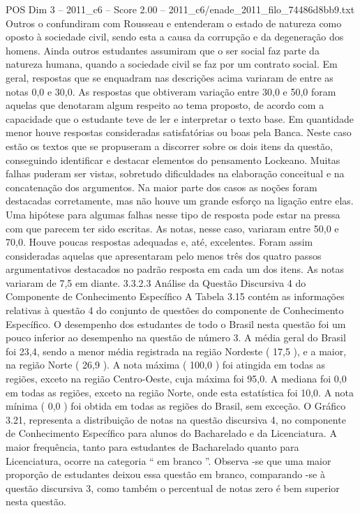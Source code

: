 \begin{textsample}{POS Dim 3 – 2011\_c6 – Score 2.00 – 2011\_c6/enade\_2011\_filo\_74486d8bb9.txt}
Outros o confundiram com Rousseau e entenderam o estado de natureza como oposto à sociedade civil, sendo esta a causa da corrupção e da degeneração dos homens.
Ainda outros estudantes assumiram que o ser social faz parte da natureza humana, quando a sociedade civil se faz por um contrato social.
Em geral, respostas que se enquadram nas descrições acima variaram de entre as notas 0,0 e 30,0.
As respostas que obtiveram variação entre 30,0 e 50,0 foram aquelas que denotaram algum respeito ao tema proposto, de acordo com a capacidade que o estudante teve de ler e interpretar o texto base.
Em quantidade menor houve respostas consideradas satisfatórias ou boas pela Banca.
Neste caso estão os textos que se propuseram a discorrer sobre os dois itens da questão, conseguindo identificar e destacar elementos do pensamento Lockeano.
Muitas falhas puderam ser vistas, sobretudo dificuldades na elaboração conceitual e na concatenação dos argumentos.
Na maior parte dos casos as noções foram destacadas corretamente, mas não houve um grande esforço na ligação entre elas.
Uma hipótese para algumas falhas nesse tipo de resposta pode estar na pressa com que parecem ter sido escritas.
As notas, nesse caso, variaram entre 50,0 e 70,0.
Houve poucas respostas adequadas e, até, excelentes.
Foram assim consideradas aquelas que apresentaram pelo menos três dos quatro passos argumentativos destacados no padrão resposta em cada um dos itens.
As notas variaram de 7,5 em diante. 3.3.2.3 Análise da Questão Discursiva 4 do Componente de Conhecimento Específico A Tabela 3.15 contém as informações relativas à questão 4 do conjunto de questões do componente de Conhecimento Específico.
O desempenho dos estudantes de todo o Brasil nesta questão foi um pouco inferior ao desempenho na questão de número 3.
A média geral do Brasil foi 23,4, sendo a menor média registrada na região Nordeste ( 17,5 ), e a maior, na região Norte ( 26,9 ).
A nota máxima ( 100,0 ) foi atingida em todas as regiões, exceto na região Centro-Oeste, cuja máxima foi 95,0.
A mediana foi 0,0 em todas as regiões, exceto na região Norte, onde esta estatística foi 10,0.
A nota mínima ( 0,0 ) foi obtida em todas as regiões do Brasil, sem exceção.
O Gráfico 3.21, representa a distribuição de notas na questão discursiva 4, no componente de Conhecimento Específico para alunos do Bacharelado e da Licenciatura.
A maior frequência, tanto para estudantes de Bacharelado quanto para Licenciatura, ocorre na categoria “ em branco ”.
Observa -se que uma maior proporção de estudantes deixou essa questão em branco, comparando -se à questão discursiva 3, como também o percentual de notas zero é bem superior nesta questão.

\end{textsample}
